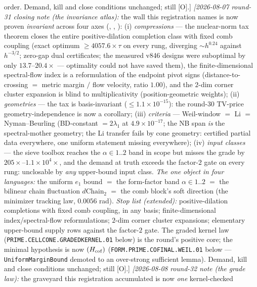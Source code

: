 {order.  Demand, kill and close
conditions unchanged; still [O].]
\emph{[2026-08-07 round-31 closing note (the invariance
atlas):} the wall this registration names is now proven
\emph{invariant} across four axes
(,
,
): (i) \emph{compressions} ---
the nuclear-norm tax theorem closes the entire positive-dilation
completion class with fixed comb coupling (exact optimum
$\ge 4057.6\times\tau$ on every rung, diverging $\sim h^{0.24}$
against $h^{-3/2}$; zero-gap dual certificates; the measured
v846 designs were suboptimal by only $13.7$--$20.4\times$ ---
optimality could not have saved them), the finite-dimensional
spectral-flow index is a reformulation of the endpoint pivot
signs (distance-to-crossing $=$ metric margin $/$ flow velocity,
ratio $1.00$), and the $2$-dim corner cluster expansion is blind
to multiplicativity (position-geometric weights); (ii)
\emph{geometries} --- the tax is basis-invariant
($\le 1.1\times10^{-15}$): the round-30 TV-price
geometry-independence is now a corollary; (iii) \emph{criteria}
--- Weil-window $=$ Li $=$ Nyman--Beurling (BD-constant $=
2\lambda_1$ at $4.9\times10^{-17}$; the NB span \emph{is} the
spectral-mother geometry; the Li transfer fails by cone
geometry: certified partial data everywhere, one uniform
statement missing everywhere); (iv) \emph{input classes} --- the
sieve toolbox reaches the $\alpha \in 1..2$ band in scope but
misses the grade by $205\times$--$1.1\times10^{4}\times$, and
the demand at truth exceeds the factor-$2$ gate on every rung:
unclosable by \emph{any} upper-bound input class.  \emph{The one
object in four languages:} the uniform $e_1$ bound $=$ the
form-factor band $\alpha \in 1..2$ $=$ the bilinear chain
fluctuation $d\mathrm{Chain}_2$ $=$ the comb block's soft
direction (the minimizer tracking law, $0.0056$ rad).
\emph{Stop list (extended):} positive-dilation completions with
fixed comb coupling, in any basis; finite-dimensional
index/spectral-flow reformulations; $2$-dim corner cluster
expansions; elementary upper-bound supply rows against the
factor-$2$ gate.  The graded kernel law
(\texttt{PRIME.CELLCONE.GRADEDKERNEL.01} below) is the round's
positive core; the minimal hypothesis is now $(H_{\rm cof})$
(\texttt{FORM.PRIME.COFINAL.WEIL.01} below ---
\texttt{UniformMarginBound} demoted to an over-strong sufficient
lemma).  Demand, kill and close conditions unchanged; still
[O].]
\emph{[2026-08-08 round-32 note (the grade law):} the graveyard
this registration accumulated is now \emph{one} kernel-checked
}

